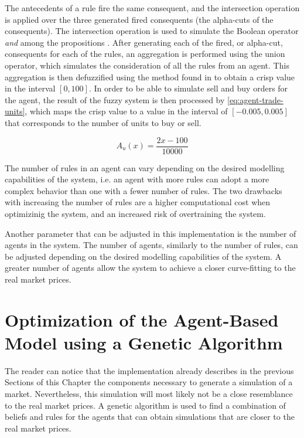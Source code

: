 The antecedents of a rule fire the same consequent, and the intersection
operation is applied over the three generated fired consequents (the alpha-cuts
of the consequents). The intersection operation is used to simulate the Boolean
operator \textit{and} among the propositions \cite{Atanassov1986}. After
generating each of the fired, or alpha-cut, consequents for each of the rules,
an aggregation is performed using the union operator, which simulates the
consideration of all the rules from an agent. This aggregation is then
defuzzified using the method found in \cite{Hernandez-Aguila2017} to obtain a
crisp value in the interval $[0, 100]$. In order to be able to simulate sell and
buy orders for the agent, the result of the fuzzy system is then processed by
\ref{eq:agent-trade-units}, which maps the crisp value to a value in the
interval of $[-0.005, 0.005]$ that corresponds to the number of units to buy or
sell.

\begin{equation}
  \label{eq:agent-trade-units}
  A_u(x) = \frac{2x - 100}{10000}
\end{equation}

The number of rules in an agent can vary depending on the desired modelling
capabilities of the system, i.e. an agent with more rules can adopt a more
complex behavior than one with a fewer number of rules. The two drawbacks with
increasing the number of rules are a higher computational cost when optimizinig
the system, and an increased risk of overtraining the system.

Another parameter that can be adjusted in this implementation is the number of
agents in the system. The number of agents, similarly to the number of rules,
can be adjusted depending on the desired modelling capabilities of the system. A
greater number of agents allow the system to achieve a closer curve-fitting to
the real market prices.

\section{Optimization of the Agent-Based Model using a Genetic Algorithm}
\label{section:optimization-of-the-agent-based-model-using-a-genetic-algorithm}

The reader can notice that the implementation already describes in the previous
Sections of this Chapter the components necessary to generate a simulation of a
market. Nevertheless, this simulation will most likely not be a close
resemblance to the real market prices. A genetic algorithm is used to find a
combination of beliefs and rules for the agents that can obtain simulations that
are closer to the real market prices.

